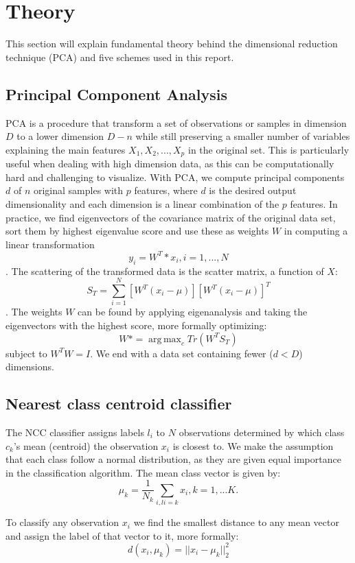 \documentclass[journal]{IEEEtran}
\DeclareMathOperator*{\argmax}{arg\,max}
\begin{document}
\section{Theory}
This section will explain fundamental theory behind the dimensional reduction technique (PCA) and five schemes used in this report.

\subsection{Principal Component Analysis}

PCA is a procedure that transform a set of observations or samples in dimension $D$ to a lower dimension $D-n$ while still preserving a smaller number of variables explaining the main features $X_{1}, X_{2}, ..., X_{p}$ in the original set. This is particularly useful when dealing with high dimension data, as this can be computationally hard and challenging to visualize. With PCA, we compute principal components $d$ of $n$ original samples with $p$ features, where $d$ is the desired output dimensionality and each dimension is a linear combination of the $p$ features. In practice, we find eigenvectors of the covariance matrix of the original data set, sort them by highest eigenvalue score and use these as weights $W$ in computing a linear transformation $$y_{i} = W^T*x_{i}, i = 1, ..., N$$. The scattering of the transformed data is the scatter matrix, a function of $X$: $$S_{T} = \sum_{i=1}^{N} [W^T(x_{i}-\mu)][W^T(x_{i}-\mu)]^T$$. The weights $W$ can be found by applying eigenanalysis and taking the eigenvectors with the  highest score, more formally optimizing: \[ W* = \argmax_c Tr (W^TS_{T}) \] subject to $ W^TW=I$. We end with a data set containing fewer ($d < D$) dimensions.

\subsection{Nearest class centroid classifier}

The NCC classifier assigns labels $l_{i}$ to $N$ observations determined by which class $c_{k}$'s mean (centroid) the observation $x_{i}$ is closest to. We make the assumption that each class follow a normal distribution, as they are given equal importance in the classification algorithm. The mean class vector is given by: $$ \mu_{k} = \frac{1}{N_{k}} \sum_{i,li=k}^{} x_{i}, k = 1, ... K. $$

To classify any observation $x_{i}$ we find the smallest distance to any mean vector and assign the label of that vector to it, more formally: $$ d(x_{i},\mu_{k}) = ||x_{i}-\mu_{k}||^2_{2} $$
\end{document}
